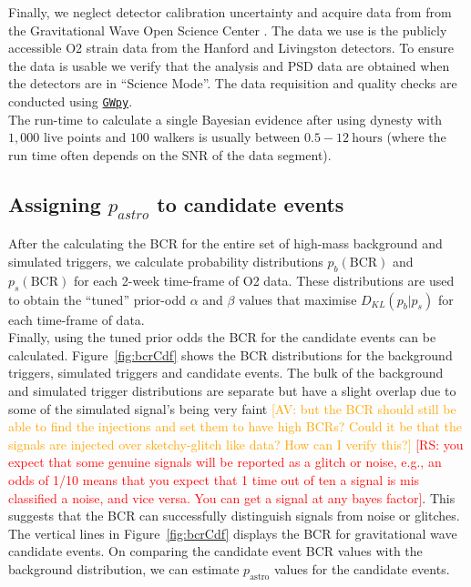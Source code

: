 \documentclass[%
preprint,
 amsmath,amssymb,
 aps,
]{revtex4}
\newcommand{\dynesty}{{\sc dynesty}\xspace}
\newcommand{\gwpy}{{\sc \href{https://gwpy.github.io/}{\texttt{GWpy}}}\xspace}
\newcommand{\bcr}{{\sc BCR}\xspace}
\newcommand{\av}[1]{\textcolor{orange}{[AV: #1]}}
\newcommand{\rs}[1]{\textcolor{red}{[RS: #1]}}
\begin{document}
Finally, we neglect detector calibration uncertainty and acquire data from from the Gravitational Wave Open Science Center \cite{GWOSC}. The data we use is the publicly accessible O2 strain data from the Hanford and Livingston detectors. To ensure the data is usable we verify that the analysis and PSD data are obtained when the detectors are  in ``Science Mode''. The data requisition and quality checks are conducted using \gwpy \cite{gwpy}. \\

The run-time to calculate a single Bayesian evidence after using \dynesty with $1,000$ live points and $100$ walkers is usually between $0.5-12\ \text{hours}$ (where the run time often depends on the SNR of the data segment). \\

\subsection{Assigning $p_{astro}$ to candidate events}

After the calculating the \bcr for the entire set of high-mass background and simulated triggers, we calculate probability distributions $p_b(\text{BCR})$ and $p_s(\text{BCR})$ for each 2-week time-frame of O2 data. These distributions are used to obtain the ``tuned'' prior-odd $\alpha$ and $\beta$ values that maximise $D_{KL}(p_b|p_s)$ for each time-frame of data.\\

Finally, using the tuned prior odds the \bcr for the candidate events can be calculated. Figure~\ref{fig:bcrCdf} shows the \bcr distributions for the background triggers, simulated triggers and candidate events. The bulk of the background and simulated trigger distributions are separate but have a slight overlap due to some of the simulated signal's being very faint \av{but the BCR should still be able to find the injections and set them to have high BCRs? Could it be that the signals are injected over sketchy-glitch like data? How can I verify this?} \rs{you expect that some genuine signals will be reported as a glitch or noise, e.g., an odds of 1/10 means that you expect that 1 time out of ten a signal is mis classified a noise, and vice versa. You can get a signal at any bayes factor}. This suggests that the \bcr can successfully distinguish signals from noise or glitches. The vertical lines in Figure~\ref{fig:bcrCdf} displays the \bcr for gravitational wave candidate events. On comparing the candidate event \bcr values with the background distribution, we can estimate $p_\text{astro}$ values for the candidate events. 
\end{document}
